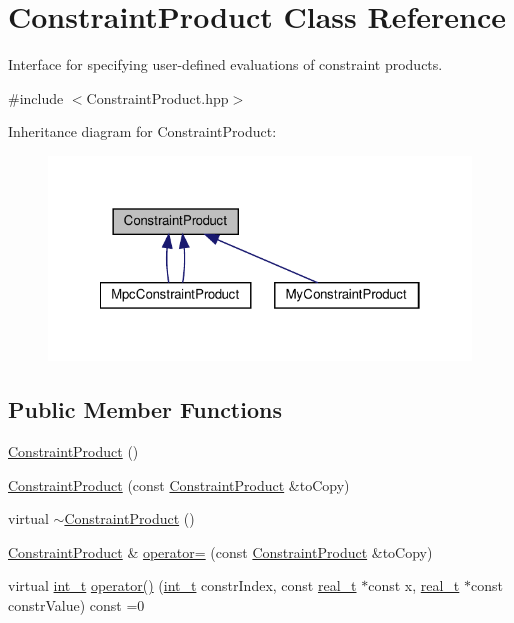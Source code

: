 \hypertarget{class_constraint_product}{}\section{Constraint\+Product Class Reference}
\label{class_constraint_product}


Interface for specifying user-\/defined evaluations of constraint products.  




{\ttfamily \#include $<$Constraint\+Product.\+hpp$>$}



Inheritance diagram for Constraint\+Product\+:
\nopagebreak
\begin{figure}[H]
\begin{center}
\leavevmode
\includegraphics[width=322pt]{class_constraint_product__inherit__graph}
\end{center}
\end{figure}
\subsection*{Public Member Functions}
\begin{DoxyCompactItemize}
\item 
\hyperlink{class_constraint_product_a0ebfb337c4d8f8a562263f29d40cb7d3}{Constraint\+Product} ()
\item 
\hyperlink{class_constraint_product_ac12f0cd2dfa2ad122e69435d868753cb}{Constraint\+Product} (const \hyperlink{class_constraint_product}{Constraint\+Product} \&to\+Copy)
\item 
virtual \hyperlink{class_constraint_product_aed57ccadc2d93bc14ead078e22912df3}{$\sim$\+Constraint\+Product} ()
\item 
\hyperlink{class_constraint_product}{Constraint\+Product} \& \hyperlink{class_constraint_product_a228861b89ad8f6403f307d3110862f62}{operator=} (const \hyperlink{class_constraint_product}{Constraint\+Product} \&to\+Copy)
\item 
virtual \hyperlink{_types_8hpp_ab6fd6105e64ed14a0c9281326f05e623}{int\+\_\+t} \hyperlink{class_constraint_product_a597e1001d283a43844b4bb8d45d6b9bd}{operator()} (\hyperlink{_types_8hpp_ab6fd6105e64ed14a0c9281326f05e623}{int\+\_\+t} constr\+Index, const \hyperlink{qp_o_a_s_e_s__wrapper_8h_a0d00e2b3dfadee81331bbb39068570c4}{real\+\_\+t} $\ast$const x, \hyperlink{qp_o_a_s_e_s__wrapper_8h_a0d00e2b3dfadee81331bbb39068570c4}{real\+\_\+t} $\ast$const constr\+Value) const =0
\end{DoxyCompactItemize}


